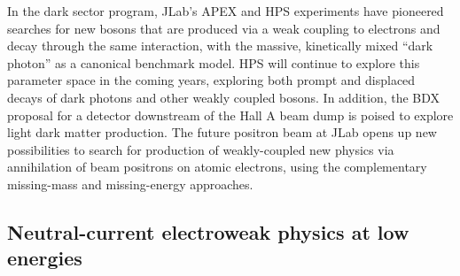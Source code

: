 In the dark sector program, JLab's APEX and HPS experiments have pioneered searches for new bosons that are produced via a weak coupling to electrons and decay through the same interaction, with the massive, kinetically mixed ``dark photon'' as a canonical benchmark model.  HPS will continue to explore this parameter space in the coming years, exploring both prompt and displaced decays of dark photons and other weakly coupled bosons. In addition, the BDX proposal for a detector downstream of the Hall A beam dump is poised to explore light dark matter production. %
The future positron beam at JLab opens up new possibilities to search for production of weakly-coupled new physics via annihilation of beam positrons on atomic electrons, using the complementary missing-mass and missing-energy approaches. 

\subsection{ Neutral-current electroweak physics at low energies}
\label{sec:MOLLER}

